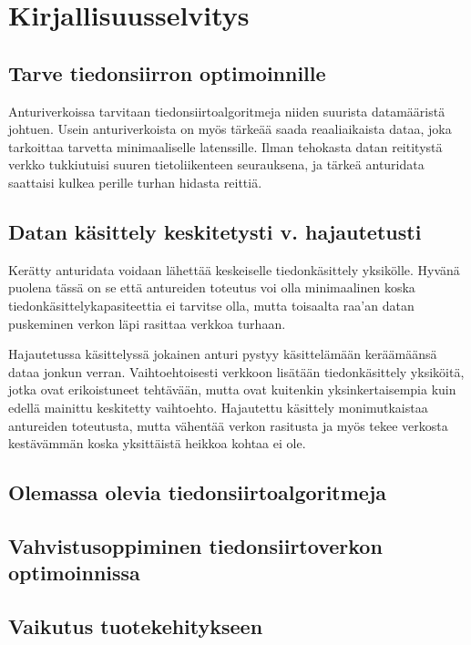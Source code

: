 \section{Kirjallisuusselvitys}

\subsection{Tarve tiedonsiirron optimoinnille}
Anturiverkoissa tarvitaan tiedonsiirtoalgoritmeja niiden suurista datamääristä
johtuen. Usein anturiverkoista on myös tärkeää saada reaaliaikaista dataa, joka
tarkoittaa tarvetta minimaaliselle latenssille. Ilman tehokasta datan
reititystä verkko tukkiutuisi suuren tietoliikenteen seurauksena, ja tärkeä
anturidata saattaisi kulkea perille turhan hidasta reittiä. 

\subsection{Datan käsittely keskitetysti v. hajautetusti}
Kerätty anturidata voidaan lähettää keskeiselle tiedonkäsittely yksikölle.
Hyvänä puolena tässä on se että antureiden toteutus voi olla minimaalinen koska
tiedonkäsittelykapasiteettia ei tarvitse olla, mutta toisaalta raa'an datan
puskeminen verkon läpi rasittaa verkkoa turhaan.

Hajautetussa käsittelyssä jokainen anturi pystyy käsittelämään keräämäänsä
dataa jonkun verran. Vaihtoehtoisesti verkkoon lisätään tiedonkäsittely
yksiköitä, jotka ovat erikoistuneet tehtävään, mutta ovat kuitenkin
yksinkertaisempia kuin edellä mainittu keskitetty vaihtoehto. Hajautettu
käsittely monimutkaistaa antureiden toteutusta, mutta vähentää verkon rasitusta
ja myös tekee verkosta kestävämmän koska yksittäistä heikkoa kohtaa ei ole.

\subsection{Olemassa olevia tiedonsiirtoalgoritmeja}

\subsection{Vahvistusoppiminen tiedonsiirtoverkon optimoinnissa}

\subsection{Vaikutus tuotekehitykseen}

